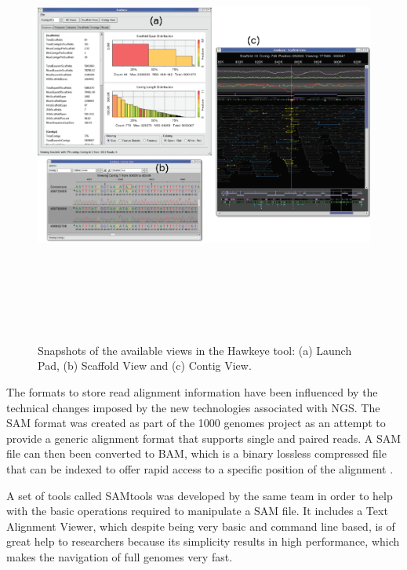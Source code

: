 \begin{figure}  
\includegraphics[height=5.7in,angle=90]{figures/hawkeye.png}
\caption[Hawkeye Interface Views.]{Snapshots of the available views in the Hawkeye tool: (a) Launch Pad, (b) Scaffold View and (c) Contig View.
\label{fig:hawkeye}}
\end{figure}

The formats to store read alignment information have been influenced by the technical changes imposed by the new technologies associated with NGS. The SAM format was created as part of the 1000 genomes project as an attempt to provide a generic alignment format that supports single and paired reads. A SAM file can then been converted to BAM, which is a binary lossless compressed file that can be indexed to offer rapid access to a specific position of the alignment \cite{HEN2009}. 

A set of tools called SAMtools was developed by the same team in order to help with the basic operations required to manipulate a SAM file. It includes a Text Alignment Viewer, which despite being very basic and command line based, is of great help to researchers because its simplicity results in high performance, which makes the navigation of full genomes very fast.

